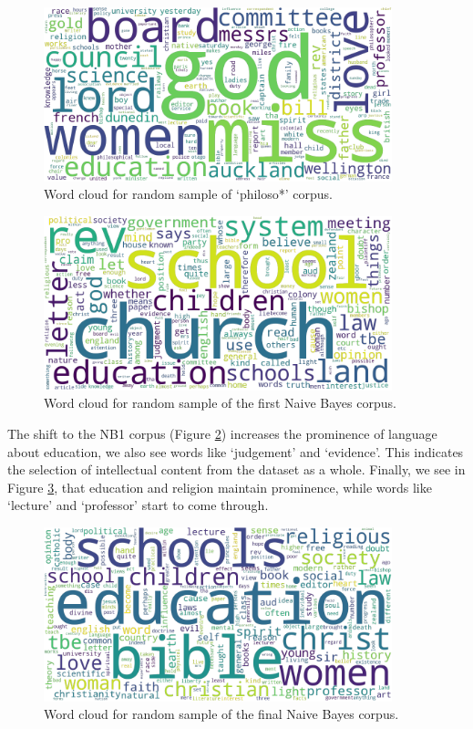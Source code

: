 \documentclass{article}
\begin{document}
\begin{figure}
  \centering
  \includegraphics[width=0.9\textwidth]{images/philoso_tf-idf.png}
  \caption{Word cloud for random sample of `philoso*' corpus.}
  \label{f:wc-philoso}
\end{figure}


\begin{figure}
  \centering
  \includegraphics[width=0.9\textwidth]{images/nb1_philoso_tf-idf.png}
  \caption{Word cloud for random sample of the first Naive Bayes corpus.}
  \label{f:wc-nb1}
\end{figure}

The shift to the NB1 corpus (Figure \ref{f:wc-nb1}) increases the prominence of language about education, we also see words like `judgement' and `evidence'. This indicates the selection of intellectual content from the dataset as a whole. Finally, we see in Figure \ref{f:wc-nb2}, that education and religion maintain prominence, while words like `lecture' and `professor' start to come through.

\begin{figure}
  \centering
  \includegraphics[width=0.9\textwidth]{images/nb2_v2_philoso_tf-idf.png}
  \caption{Word cloud for random sample of the final Naive Bayes corpus.}
  \label{f:wc-nb2}
\end{figure}
\end{document}
